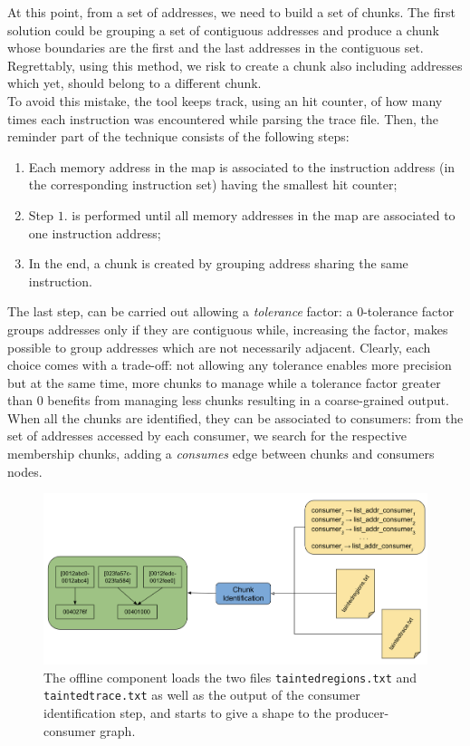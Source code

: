 \documentclass[LaM,binding=0.6cm]{sapthesis}
\begin{document}
At this point, from a set of addresses, we need to build a set of chunks. The first solution could be grouping a set of contiguous addresses and produce a chunk whose boundaries are the first and the last addresses in the contiguous set. Regrettably, using this method, we risk to create a chunk also including addresses which yet, should belong to a different chunk.\\
To avoid this mistake, the tool keeps track, using an hit counter, of how many times each instruction was encountered while parsing the trace file. Then, the reminder part of the technique consists of the following steps:
\begin{enumerate}
\item Each memory address in the map is associated to the instruction address (in the corresponding instruction set) having the smallest hit counter;
\item Step $1.$ is performed until all memory addresses in the map are associated to one instruction address;
\item In the end, a chunk is created by grouping address sharing the same instruction.
\end{enumerate} 
The last step, can be carried out allowing a \textit{tolerance} factor: a $0$-tolerance factor groups addresses only if they are contiguous while, increasing the factor, makes possible to group addresses which are not necessarily adjacent. Clearly, each choice comes with a trade-off: not allowing any tolerance enables more precision but at the same time, more chunks to manage while a tolerance factor greater than $0$ benefits from managing less chunks resulting in a coarse-grained output.\\

When all the chunks are identified, they can be associated to consumers: from the set of addresses accessed by each consumer, we search for the respective membership chunks, adding a \textit{consumes} edge between chunks and consumers nodes.

\begin{figure}[h!]
\centering
\includegraphics[scale=.5]{images/dtatracker5}
\caption{The offline component loads the two files \texttt{taintedregions.txt} and \texttt{taintedtrace.txt} as well as the output of the consumer identification step, and starts to give a shape to the producer-consumer graph.}
\end{figure}
\end{document}

